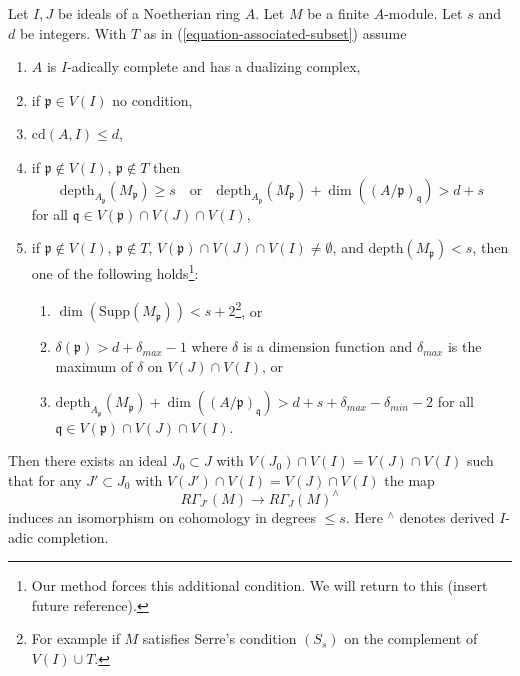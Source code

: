 %
\begin{lemma}
\label{lemma-algebraize-local-cohomology-general}
Let $I, J$ be ideals of a Noetherian ring $A$.
Let $M$ be a finite $A$-module.
Let $s$ and $d$ be integers. With $T$ as in
(\ref{equation-associated-subset}) assume
\begin{enumerate}
\item $A$ is $I$-adically complete and has a dualizing complex,
\item if $\mathfrak p \in V(I)$ no condition,
\item $\text{cd}(A, I) \leq d$,
\item if $\mathfrak p \not \in V(I)$, $\mathfrak p \not \in T$ then
$$
\text{depth}_{A_\mathfrak p}(M_\mathfrak p) \geq s
\quad\text{or}\quad
\text{depth}_{A_\mathfrak p}(M_\mathfrak p) +
\dim((A/\mathfrak p)_\mathfrak q) > d + s
$$
for all $\mathfrak q \in V(\mathfrak p) \cap V(J) \cap V(I)$,
\item if $\mathfrak p \not \in V(I)$, $\mathfrak p \not \in T$,
$V(\mathfrak p) \cap V(J) \cap V(I) \not = \emptyset$, and
$\text{depth}(M_\mathfrak p) < s$, then one
of the following holds\footnote{Our method
forces this additional condition. We will return to this
(insert future reference).}:
\begin{enumerate}
\item $\dim(\text{Supp}(M_\mathfrak p)) < s + 2$\footnote{For example
if $M$ satisfies Serre's condition $(S_s)$
on the complement of $V(I) \cup T$.}, or
\item  $\delta(\mathfrak p) > d + \delta_{max} - 1$
where $\delta$ is a dimension function and $\delta_{max}$
is the maximum of $\delta$ on $V(J) \cap V(I)$, or
\item $\text{depth}_{A_\mathfrak p}(M_\mathfrak p) +
\dim((A/\mathfrak p)_\mathfrak q) > d + s + \delta_{max} - \delta_{min} - 2$
for all $\mathfrak q \in V(\mathfrak p) \cap V(J) \cap V(I)$.
\end{enumerate}
\end{enumerate}
Then there exists an ideal $J_0 \subset J$ with
$V(J_0) \cap V(I) = V(J) \cap V(I)$
such that for any $J' \subset J_0$ with
$V(J') \cap V(I) = V(J) \cap V(I)$ the map
$$
R\Gamma_{J'}(M) \longrightarrow R\Gamma_J(M)^\wedge
$$
induces an isomorphism on cohomology in degrees $\leq s$.
Here ${}^\wedge$ denotes derived $I$-adic completion.
\end{lemma}

